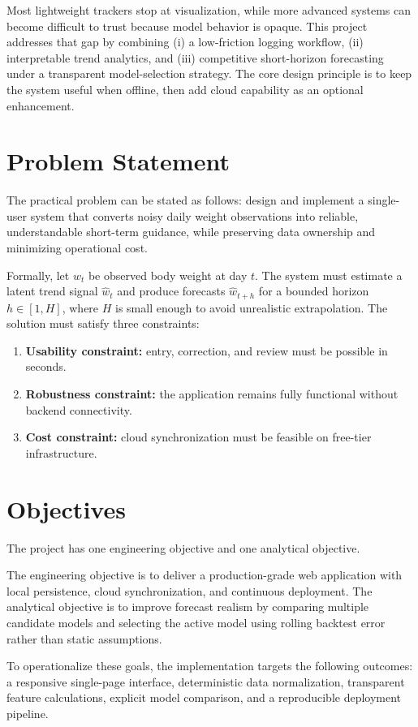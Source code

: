 \documentclass[12pt,a4paper]{report}
\begin{document}
Most lightweight trackers stop at visualization, while more advanced systems can become difficult to trust because model behavior is opaque. This project addresses that gap by combining (i) a low-friction logging workflow, (ii) interpretable trend analytics, and (iii) competitive short-horizon forecasting under a transparent model-selection strategy. The core design principle is to keep the system useful when offline, then add cloud capability as an optional enhancement.

\section{Problem Statement}
The practical problem can be stated as follows: design and implement a single-user system that converts noisy daily weight observations into reliable, understandable short-term guidance, while preserving data ownership and minimizing operational cost.

Formally, let $w_t$ be observed body weight at day $t$. The system must estimate a latent trend signal $\hat{w}_t$ and produce forecasts $\hat{w}_{t+h}$ for a bounded horizon $h \in [1,H]$, where $H$ is small enough to avoid unrealistic extrapolation. The solution must satisfy three constraints:
\begin{enumerate}[label=\arabic*.]
  \item \textbf{Usability constraint:} entry, correction, and review must be possible in seconds.
  \item \textbf{Robustness constraint:} the application remains fully functional without backend connectivity.
  \item \textbf{Cost constraint:} cloud synchronization must be feasible on free-tier infrastructure.
\end{enumerate}

\section{Objectives}
The project has one engineering objective and one analytical objective.

The engineering objective is to deliver a production-grade web application with local persistence, cloud synchronization, and continuous deployment. The analytical objective is to improve forecast realism by comparing multiple candidate models and selecting the active model using rolling backtest error rather than static assumptions.

To operationalize these goals, the implementation targets the following outcomes: a responsive single-page interface, deterministic data normalization, transparent feature calculations, explicit model comparison, and a reproducible deployment pipeline.
\end{document}
